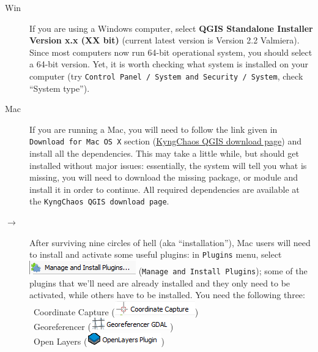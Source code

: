 \documentclass[12pt,oneside]{article}
\begin{document}
\begin{description}
\item[Win]If you are using a Windows computer, select \textbf{QGIS Standalone Installer Version x.x (XX bit)} (current latest version is Version 2.2 Valmiera). Since most computers now run 64-bit operational system, you should select a 64-bit version. Yet, it is worth checking what system is installed on your computer (try \texttt{Control Panel~/ System and Security~/ System}, check ``System type'').

\item[Mac]If you are running a Mac, you will need to follow the link given in \texttt{Download for Mac OS X} section (\href{http://www.kyngchaos.com/software/qgis}{KyngChaos QGIS download page}) and install all the dependencies. This may take a little while, but \QGIS should get installed without major issues: essentially, the system will tell you what is missing, you will need to download the missing package, or module and install it in order to continue. All required dependencies are available at the \texttt{KyngChaos QGIS download page}.

\item[$\rightarrow$] After surviving nine circles of hell (aka ``installation''), Mac users will need to install and activate some useful plugins: in \texttt{Plugins} menu, select \includegraphics[scale=.75]{qgis_plugins} (\texttt{Manage and Install Plugins}); some of the plugins that we'll need are already installed and they only need to be activated, while others have to be installed. You need the following three:\\
\textbullet~Coordinate Capture (\includegraphics[scale=.5]{qgis_capture})\\
\textbullet~Georeferencer (\includegraphics[scale=.5]{qgis_georeferencer})\\
\textbullet~Open Layers (\includegraphics[scale=.5]{qgis_openlayers})\\


\end{description}
\end{document}
